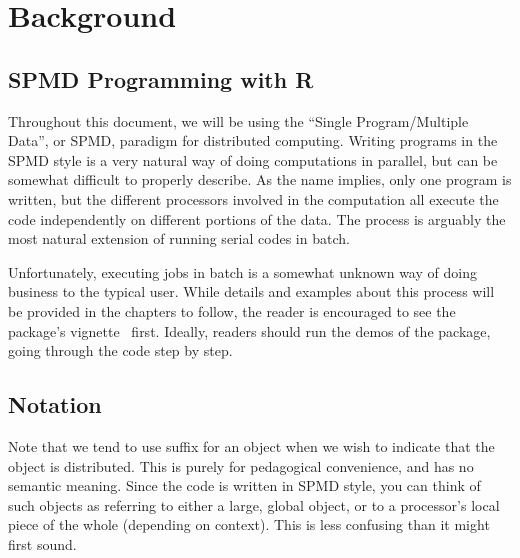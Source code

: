 \chapter{Background}
\label{sec:bg}

% 



\section{SPMD Programming with R}

Throughout this document, we will be using the ``Single Program/Multiple Data'', or SPMD, paradigm for distributed computing.  Writing programs in the SPMD style is a very natural way of doing computations in parallel, but can be somewhat difficult to properly describe.  As the name implies, only one program is written, but the different processors involved in the computation all execute the code independently on different portions of the data.  The process is arguably the most natural extension of running serial codes in batch.  

Unfortunately, executing jobs in batch is a somewhat unknown way of doing business to the typical  user.  While details and examples about this process will be provided in the chapters to follow, the reader is encouraged to see the  package's vignette~\citep{Chen2012pbdMPIvignette} first.  Ideally, readers should run the demos of the  package,
going through the code step by step.



\section[Notation]{Notation}
\label{sec:notation}

Note that we tend to use suffix  for an object when we wish to indicate that the object is distributed.  This is purely for pedagogical convenience, and has no semantic meaning.  Since the code is written in SPMD style, you can think of such objects as referring to either a large, global object, or to a processor's local piece of the whole (depending on context).  This is less confusing than it might first sound.

